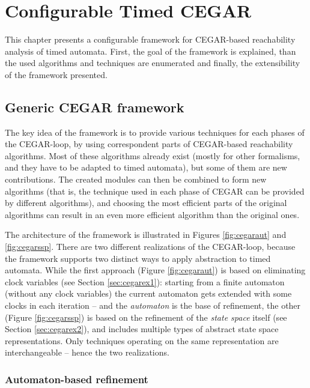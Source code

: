\chapter{Configurable Timed CEGAR} \label{chap:timed_cegar}

This chapter presents a configurable framework for CEGAR-based reachability analysis of timed automata. First, the goal of the framework is explained, than the used algorithms and techniques are enumerated and finally, the extensibility of the framework presented. 

\section{Generic CEGAR framework}

The key idea of the framework is to provide various techniques for each phases of the CEGAR-loop, by using correspondent parts of CEGAR-based reachability algorithms. Most of these algorithms already exist (mostly for other formalisms, and they have to be adapted to timed automata), but some of them are new contributions. The created modules can then be combined to form new algorithms (that is, the technique used in each phase of CEGAR can be provided by different algorithms), and choosing the most efficient parts of the original algorithms can result in an even more efficient algorithm than the original ones. 

The architecture of the framework is illustrated in Figures \ref{fig:cegaraut} and \ref{fig:cegarssp}. There are two different realizations of the CEGAR-loop, because the framework supports two distinct ways to apply abstraction to timed automata. While the first approach (Figure \ref{fig:cegaraut}) is based on eliminating clock variables (see Section \ref{sec:cegarex1}):  starting from a finite automaton (without any clock variables) the current automaton gets extended with some clocks in each iteration -- and the \emph{automaton} is the base of refinement, the other (Figure \ref{fig:cegarssp}) is based on the refinement of the \emph{state space} itself (see Section \ref{sec:cegarex2}), and includes multiple types of abstract state space representations. Only techniques operating on the same representation are interchangeable -- hence the two realizations.

\subsection{Automaton-based refinement}

